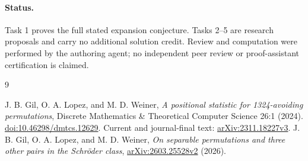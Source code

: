 \documentclass[11pt]{article}
\begin{document}
\paragraph{Status.}
Task 1 proves the full stated expansion conjecture. Tasks 2--5
are research proposals and carry no additional solution credit.
Review and computation were performed by the authoring agent;
no independent peer review or proof-assistant certification is claimed.

\begin{thebibliography}{9}\raggedright
{} J. B. Gil, O. A. Lopez, and M. D. Weiner,
\emph{A positional statistic for 1324-avoiding permutations},
Discrete Mathematics \& Theoretical Computer Science 26:1 (2024).
\href{https://doi.org/10.46298/dmtcs.12629}{doi:10.46298/dmtcs.12629}.
Current and journal-final text:
\href{https://arxiv.org/abs/2311.18227v3}{arXiv:2311.18227v3}.
 J. B. Gil, O. A. Lopez, and M. D. Weiner,
\emph{On separable permutations and three other pairs in the
Schr\"oder class},
\href{https://arxiv.org/abs/2603.25528v2}{arXiv:2603.25528v2} (2026).
\end{thebibliography}
\end{document}
